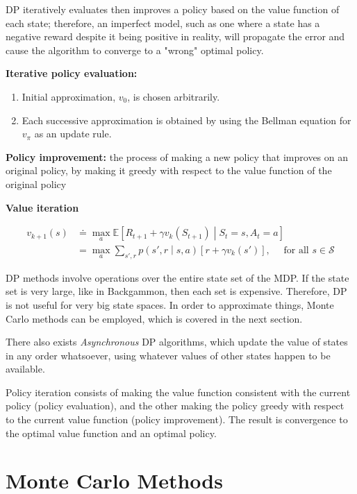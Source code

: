 \documentclass{article}
\begin{document}
DP iteratively evaluates then improves a policy based on the value function of each state; therefore, an imperfect model, such as one where a state has a negative reward despite it being positive in reality, will propagate the error and cause the algorithm to converge to a "wrong" optimal policy. 

\textbf{Iterative policy evaluation:}

\begin{enumerate}
\def\labelenumi{\arabic{enumi}.}
\item
  Initial approximation, \(v_0\), is chosen arbitrarily.
\item
  Each successive approximation is obtained by using the Bellman
  equation for \(v_\pi\) as an update rule.
\end{enumerate}

\textbf{Policy improvement:} the process of making a new policy that
improves on an original policy, by making it greedy with respect to the
value function of the original policy

\textbf{Value iteration}

\[
\begin{aligned}
  v_{k+1}(s)
  & \doteq \max_a \mathbb{E} \left[ R_{t+1} + \gamma v_k(S_{t+1}) \middle| S_t = s, A_t = a \right] 
  \\
  & = \max_a \sum_{s', r} p \left( s', r \middle| s, a \right) \left[ r + \gamma v_k(s') \right], 
  \quad \text{ for all $s \in \mathcal{S}$}
\end{aligned}
\]

DP methods involve operations over the entire state set of the MDP. If
the state set is very large, like in Backgammon, then each set is
expensive. Therefore, DP is not useful for very big state spaces. In order to approximate things, Monte Carlo methods can be employed, which is covered in the next section.

There also exists \emph{Asynchronous} DP algorithms, which update the value of states in any order whatsoever, using whatever values of other states happen to be
available.

Policy iteration consists of making the value function consistent with
the current policy (policy evaluation), and the other making the policy
greedy with respect to the current value function (policy improvement).
The result is convergence to the optimal value function and an optimal
policy.

\section{Monte Carlo Methods}
\end{document}
